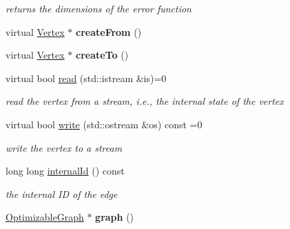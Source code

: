 \begin{DoxyCompactItemize}
\begin{DoxyCompactList}\small\item\em returns the dimensions of the error function \end{DoxyCompactList}\item 
\hypertarget{classg2o_1_1OptimizableGraph_1_1Edge_abd98d7a174df25bcc82cfdacba682fec}{virtual \hyperlink{classg2o_1_1OptimizableGraph_1_1Vertex}{Vertex} $\ast$ {\bfseries create\-From} ()}\label{classg2o_1_1OptimizableGraph_1_1Edge_abd98d7a174df25bcc82cfdacba682fec}

\item 
\hypertarget{classg2o_1_1OptimizableGraph_1_1Edge_a39c22b396ab312059ea8fa4c2776be2e}{virtual \hyperlink{classg2o_1_1OptimizableGraph_1_1Vertex}{Vertex} $\ast$ {\bfseries create\-To} ()}\label{classg2o_1_1OptimizableGraph_1_1Edge_a39c22b396ab312059ea8fa4c2776be2e}

\item 
\hypertarget{classg2o_1_1OptimizableGraph_1_1Edge_a30cf69b762a06aa35e796d8af71632b0}{virtual bool \hyperlink{classg2o_1_1OptimizableGraph_1_1Edge_a30cf69b762a06aa35e796d8af71632b0}{read} (std\-::istream \&is)=0}\label{classg2o_1_1OptimizableGraph_1_1Edge_a30cf69b762a06aa35e796d8af71632b0}

\begin{DoxyCompactList}\small\item\em read the vertex from a stream, i.\-e., the internal state of the vertex \end{DoxyCompactList}\item 
\hypertarget{classg2o_1_1OptimizableGraph_1_1Edge_a804b9a2178249b9297c55b8fbbeda56e}{virtual bool \hyperlink{classg2o_1_1OptimizableGraph_1_1Edge_a804b9a2178249b9297c55b8fbbeda56e}{write} (std\-::ostream \&os) const =0}\label{classg2o_1_1OptimizableGraph_1_1Edge_a804b9a2178249b9297c55b8fbbeda56e}

\begin{DoxyCompactList}\small\item\em write the vertex to a stream \end{DoxyCompactList}\item 
\hypertarget{classg2o_1_1OptimizableGraph_1_1Edge_ac4ab4bc451232a7ff4dca8484181fcad}{long long \hyperlink{classg2o_1_1OptimizableGraph_1_1Edge_ac4ab4bc451232a7ff4dca8484181fcad}{internal\-Id} () const }\label{classg2o_1_1OptimizableGraph_1_1Edge_ac4ab4bc451232a7ff4dca8484181fcad}

\begin{DoxyCompactList}\small\item\em the internal I\-D of the edge \end{DoxyCompactList}\item 
\hypertarget{classg2o_1_1OptimizableGraph_1_1Edge_a3684190bf8e99f39f58ffadd0dfa6b05}{\hyperlink{structg2o_1_1OptimizableGraph}{Optimizable\-Graph} $\ast$ {\bfseries graph} ()}\label{classg2o_1_1OptimizableGraph_1_1Edge_a3684190bf8e99f39f58ffadd0dfa6b05}


\end{DoxyCompactItemize}
